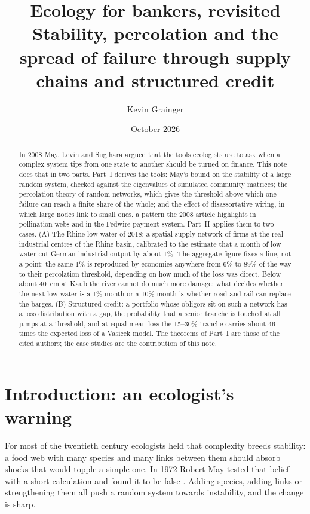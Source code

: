 \documentclass[11pt,a4paper]{article}
\title{\textbf{Ecology for bankers, revisited}\\[4pt]
\large Stability, percolation and the spread of failure through supply chains and structured credit}
\author{Kevin Grainger}
\date{October 2026}
\theoremstyle{definition}
\theoremstyle{remark}
\begin{document}
\maketitle

\begin{abstract}
\noindent
In 2008 May, Levin and Sugihara argued that the tools ecologists use to ask when a complex system tips from one state to another should be turned on finance. This note does that in two parts. Part~I derives the tools: May's bound on the stability of a large random system, checked against the eigenvalues of simulated community matrices; the percolation theory of random networks, which gives the threshold above which one failure can reach a finite share of the whole; and the effect of disassortative wiring, in which large nodes link to small ones, a pattern the 2008 article highlights in pollination webs and in the Fedwire payment system. Part~II applies them to two cases. (A) The Rhine low water of 2018: a spatial supply network of firms at the real industrial centres of the Rhine basin, calibrated to the estimate that a month of low water cut German industrial output by about 1\%. The aggregate figure fixes a line, not a point: the same 1\% is reproduced by economies anywhere from 6\% to 89\% of the way to their percolation threshold, depending on how much of the loss was direct. Below about 40~cm at Kaub the river cannot do much more damage; what decides whether the next low water is a 1\% month or a 10\% month is whether road and rail can replace the barges. (B) Structured credit: a portfolio whose obligors sit on such a network has a loss distribution with a gap, the probability that a senior tranche is touched at all jumps at a threshold, and at equal mean loss the 15--30\% tranche carries about 46 times the expected loss of a Vasicek model. The theorems of Part~I are those of the cited authors; the case studies are the contribution of this note.
\end{abstract}

\tableofcontents

\section{Introduction: an ecologist's warning}

For most of the twentieth century ecologists held that complexity breeds stability: a food web with many species and many links between them should absorb shocks that would topple a simple one. In 1972 Robert May tested that belief with a short calculation and found it to be false \citep{May1972}. Adding species, adding links or strengthening them all push a random system towards instability, and the change is sharp.
\end{document}
